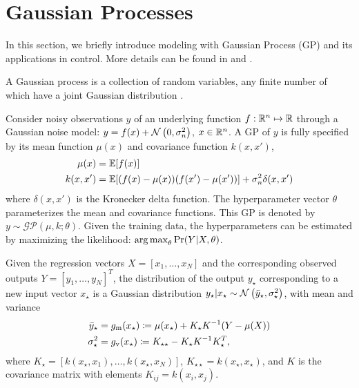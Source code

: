 \section{Gaussian Processes}
\label{S:gp}

In this section, we briefly introduce modeling with Gaussian Process (GP) and its applications in control.
More details can be found in \cite{Rasmussen2006} %
and \cite{Kocijan2016}. %

\begin{definition}
A Gaussian process is a collection of random variables, any finite number of which have a joint Gaussian distribution \cite{Rasmussen2006}.
\end{definition}
Consider noisy observations \(y\) of an underlying function \(f: \mathbb{R}^n \mapsto \mathbb{R}\) through a Gaussian noise model: \(y = f(x) + \operatorname*{\mathcal{N}}\left(0, \sigma_n^2\right)\), \(x \in \mathbb{R}^n\).
A GP of \(y\) is fully specified by its mean function \(\mu(x)\) and covariance function \(k(x,x')\),
\begin{align}
\label{E:gp:prior}
\mu(x) &= \EE [f(x)] \\
k(x,x') &= \EE [(f(x)-\mu(x)) (f(x') - \mu(x'))] + \sigma_n^2 \delta(x,x') \nonumber
\end{align}
where \(\delta(x,x')\) is the Kronecker delta function.
The hyperparameter vector \(\theta\) parameterizes the mean and covariance functions.
This GP is denoted by \(y \sim \mathcal{GP}(\mu, k; \theta)\).
Given the training data, the hyperparameters can be estimated by maximizing the likelihood: \(\operatorname*{arg\,max}_\theta \Pr(Y \vert X, \theta)\).

Given the regression vectors \(X = [x_1, \dots, x_N]\) and the corresponding observed outputs \(Y = [y_1, \dots, y_N]^T\), the distribution of the output \(y_\star\) corresponding to a new input vector \(x_\star\) is a Gaussian distribution \(y_\star | x_\star \sim \operatorname*{\mathcal{N}}\left(\bar{y}_\star, \sigma_\star^2\right)\), with mean and variance
\begin{subequations}
\label{E:gp-regression}
\begin{align}
\bar{y}_\star &= g_{\mathrm{m}} (x_{\star}) \coloneqq \mu(x_\star) + K_\star K^{-1} (Y - \mu(X))\\
\sigma_\star^2 &= g_{\mathrm{v}} (x_{\star}) \coloneqq K_{\star \star} - K_\star K^{-1} K_\star^T \text,
\end{align}
\end{subequations}
where \(K_\star = [k(x_\star, x_1), \dots, k(x_\star, x_N)]\), \(K_{\star \star} = k(x_\star, x_\star)\), and $K$ is the covariance matrix with elements \(K_{ij} = k(x_i, x_j)\).

